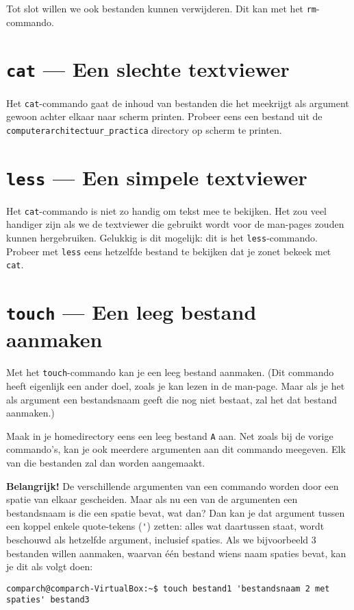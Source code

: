 \documentclass[a4paper,twoside,openany]{memoir}
\begin{document}
Tot slot willen we ook bestanden kunnen verwijderen. Dit kan met het
\verb!rm!-commando.

\section{\texttt{cat} --- Een slechte textviewer}

Het \verb!cat!-commando gaat de inhoud van bestanden die het meekrijgt als
argument gewoon achter elkaar naar scherm printen. Probeer eens een bestand uit
de \verb!computerarchitectuur_practica! directory op scherm te printen.

\section{\texttt{less} --- Een simpele textviewer}

Het \verb!cat!-commando is niet zo handig om tekst mee te bekijken. Het zou veel
handiger zijn als we de textviewer die gebruikt wordt voor de man-pages zouden
kunnen hergebruiken. Gelukkig is dit mogelijk: dit is het \verb!less!-commando.
Probeer met \verb!less! eens hetzelfde bestand te bekijken dat je zonet bekeek
met \verb!cat!.

\section{\texttt{touch} --- Een leeg bestand aanmaken}

Met het \verb!touch!-commando kan je een leeg bestand aanmaken. (Dit commando
heeft eigenlijk een ander doel, zoals je kan lezen in de man-page. Maar als je
het als argument een bestandsnaam geeft die nog niet bestaat, zal het dat
bestand aanmaken.)

Maak in je homedirectory eens een leeg bestand \verb!A! aan. Net zoals bij de
vorige commando's, kan je ook meerdere argumenten aan dit commando meegeven. Elk
van die bestanden zal dan worden aangemaakt.

\textbf{Belangrijk!} De verschillende argumenten van een commando worden door
een spatie van elkaar gescheiden. Maar als nu een van de argumenten een
bestandsnaam is die een spatie bevat, wat dan? Dan kan je dat argument tussen
een koppel enkele quote-tekens (\verb!'!) zetten: alles wat daartussen staat,
wordt beschouwd als hetzelfde argument, inclusief spaties. Als we bijvoorbeeld 3
bestanden willen aanmaken, waarvan één bestand wiens naam spaties bevat, kan je
dit als volgt doen:

\begin{verbatim}
comparch@comparch-VirtualBox:~$ touch bestand1 'bestandsnaam 2 met spaties' bestand3
\end{verbatim}
\end{document}
